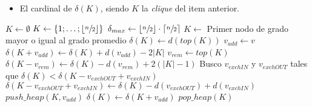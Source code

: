 \begin{pseudocodigo}
\begin{itemize}
            \item El cardinal de $\delta(K)$, siendo $K$ la \emph{clique} del item anterior.
        \end{itemize}
    \Statex
    \State $K \gets \emptyset$ 
     
        \State $K \gets \left\{1;\dots;\left\lfloor\sfrac{n}{2}\right\rfloor\right\}$ 
        \State $\delta_{max} \gets \left\lfloor\sfrac{n}{2}\right\rfloor\cdot
            \left\lceil\sfrac{n}{2}\right\rceil$ 
        \Statex
    \Else
        \State $K \gets$ Primer nodo de grado mayor o igual al grado promedio 
        \State $\delta(K) \gets d(top(K))$ 
         
            \State $v_{add} \gets v$ 
            \State $\delta(K+v_{add}) \gets \delta(K) + d(v_{add}) - 2|K|$ 
        \EndIf {}
        \Statex
        \State $v_{rem} \gets top(K)$ 
        \State $\delta(K-v_{rem}) \gets \delta(K)-d(v_{rem})+2(|K|-1)$ 
        \Statex
        \State Busco $v_{exchIN}$ y $v_{exchOUT}$ tales que $\delta(K) < \delta(K-v_{exchOUT}+v_{exchIN})$ 
        \State $\delta(K-v_{exchOUT}+v_{exchIN}) \gets \delta(K) - d(v_{exchOUT}) + d(v_{exchIN})$ 
        \Statex
         
            \Statex
             
                \State $push\_heap(K,v_{add})$ 
                \State $\delta(K) \gets \delta(K+v_{add})$ 
                \Statex
             
                \State $pop\_heap(K)$ 

\end{pseudocodigo}
